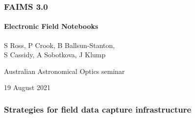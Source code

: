 \documentclass[
	aspectratio=169, %
	12pt, %
	t, %
]{beamer}
\begin{document}
\begin{refsegment}




\begin{titleframe} %
	\frametitle{FAIMS 3.0}
	\framesubtitle{Electronic Field Notebooks}

	S Ross, P Crook, B Ballsun-Stanton,\\ S Cassidy, A Sobotkova, J Klump

    \bigskip
	Australian Astronomical Optics seminar

	\vfill

	19 August 2021
\end{titleframe}





\begin{frame}
    \frametitle{Strategies for field data capture infrastructure}
    

\end{frame}
\end{refsegment}
\end{document}
